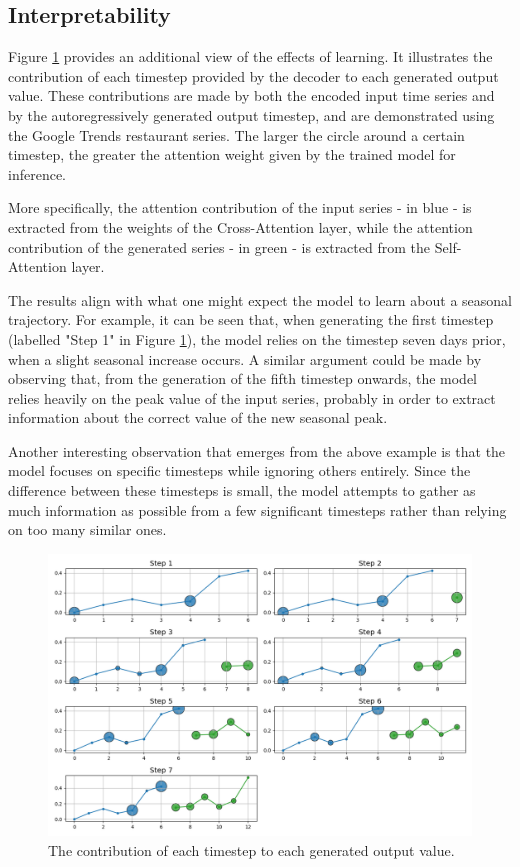 \documentclass[algorithms,article,submit,pdftex,moreauthors]{Definitions/mdpi}
\begin{document}
{\subsection{Interpretability}

Figure \ref{fig:attention} provides an additional view of the effects of learning. It illustrates the contribution of each timestep provided by the decoder  to each generated output value. These contributions are made by both the encoded input time series and by the autoregressively generated output timestep, and are demonstrated using the Google Trends restaurant series. The larger the circle around a certain timestep, the greater the attention weight given by the trained model for inference.

More specifically, the attention contribution of the input series - in blue - is extracted from the weights of the Cross-Attention layer, while the attention contribution of the generated series - in green - is extracted from the Self-Attention layer.

The results align with what one might expect the model to learn about a seasonal trajectory. For example, it can be seen that, when generating the first timestep (labelled "Step 1" in Figure \ref{fig:attention}), the model relies on the timestep seven days prior, when a slight seasonal increase occurs. A similar argument could be made by observing that, from the generation of the fifth timestep onwards, the model relies heavily on the peak value of the input series, probably in order to extract information about the correct value of the new seasonal peak.

Another interesting observation that emerges from the above example is that the model focuses on specific timesteps while ignoring others entirely. Since the difference between these timesteps is small, the model attempts to gather as much information as possible from a few significant timesteps rather than relying on too many similar ones.

\begin{figure}
	\centering
	\includegraphics[width=1.0\linewidth]{attention.png}
	\caption{The contribution of each timestep to each generated output value.}
	\label{fig:attention}
\end{figure}

}
\end{document}
